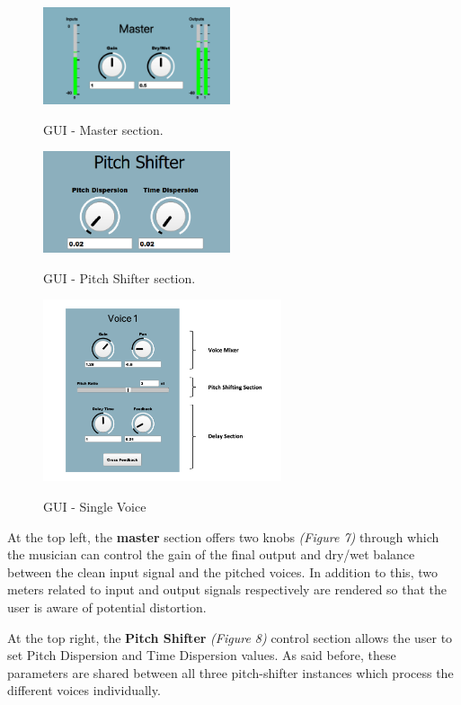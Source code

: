 \documentclass{article}
\begin{document}
\begin{figure}
    {\includegraphics[width=5.5cm]{GuiMaster.png}}\par
    \caption{GUI - Master section.}
    \vspace{3mm}
    {\includegraphics[width=5.5cm]{GuiPitchShifter.png}}\par
    \caption{GUI - Pitch Shifter section.}
    {\includegraphics[width=7cm]{GuiSingleVoiceSections.png}}\par
    \caption{GUI - Single Voice}\vspace{-28mm}
\end{figure}

At the top left, the \textbf{master} section offers two knobs \textit{(Figure 7)} through which the musician can control the gain of the final output and dry/wet balance between the clean input signal and the pitched voices. In addition to this, two meters related to input and output signals respectively are rendered so that the user is aware of potential distortion.

At the top right, the \textbf{Pitch Shifter} \textit{(Figure 8)} control section allows the user to set Pitch Dispersion and Time Dispersion values. As said before, these parameters are shared between all three pitch-shifter instances which process the different voices individually.
\end{document}
